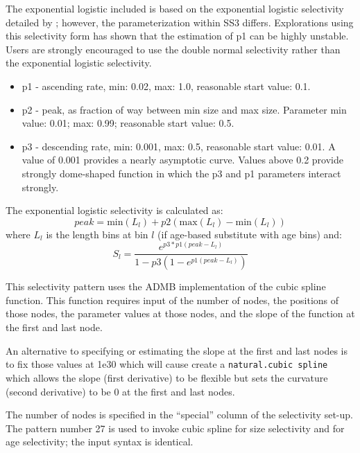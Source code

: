 The exponential logistic included is based on the exponential logistic selectivity detailed by \citet{thompson-confounding-1994}; however, the parameterization within SS3 differs. Explorations using this selectivity form has shown that the estimation of p1 can be highly unstable. Users are strongly encouraged to use the double normal selectivity rather than the exponential logistic selectivity.
	\begin{itemize}
		\item p1 - ascending rate, min: 0.02, max: 1.0, reasonable start value: 0.1.
		\item p2 - peak, as fraction of way between min size and max size. Parameter min value: 0.01; max: 0.99; reasonable start value: 0.5.
		\item p3 - descending rate, min: 0.001, max: 0.5, reasonable start value: 0.01. A value of 0.001 provides a nearly asymptotic curve. Values above 0.2 provide strongly dome-shaped function in which the p3 and p1 parameters interact strongly.
	\end{itemize}

The exponential logistic selectivity is calculated as:
	\begin{equation}
	peak = \text{min}(L_l) + p2(\text{max}(L_l) - \text{min}(L_l) )
	\end{equation}
where $L_l$ is the length bins at bin $l$ (if age-based substitute with age bins) and:
	\begin{equation}
	S_l = \frac{e^{p3*p1(peak-L_l)}}{1-p3(1-e^{p1(peak- L_l)})}
	\end{equation}

 \hypertarget{cubic-spline}{}
This selectivity pattern uses the ADMB implementation of the cubic spline
function. This function requires input of the number of nodes, the positions
of those nodes, the parameter values at those nodes, and the slope of the
function at the first and last node.

An alternative to specifying or estimating the slope at the first and last
nodes is to fix those values at 1e30 which will cause create a \verb|natural.cubic spline| 
which allows the slope (first derivative) to be flexible but
sets the curvature (second derivative) to be 0 at the first and last nodes.

The number of nodes is specified in the ``special'' column of the selectivity
set-up. The pattern number 27 is used to invoke cubic spline for size
selectivity and for age selectivity; the input syntax is identical.
	
